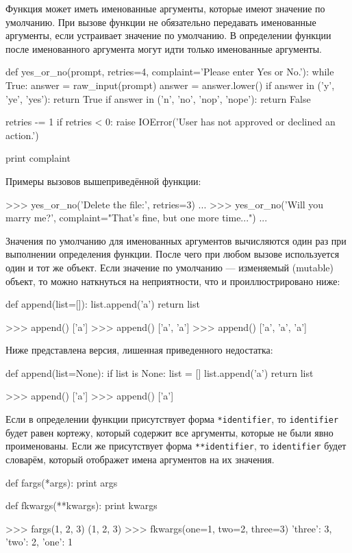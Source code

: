 Функция может иметь именованные аргументы, которые имеют значение по умолчанию. При вызове функции не обязательно передавать именованные аргументы, если устраивает значение по умолчанию. В определении функции после именованного аргумента могут идти только именованные аргументы.
\begin{pylst}{}{}
def yes_or_no(prompt, retries=4, complaint='Please enter Yes or No.'):
    while True:
        answer = raw_input(prompt)
        answer = answer.lower()
        if answer in ('y', 'ye', 'yes'):
            return True
        if answer in ('n', 'no', 'nop', 'nope'):
            return False

        retries -= 1
        if retries < 0:
            raise IOError('User has not approved or declined an action.')

        print complaint
\end{pylst}

Примеры вызовов вышеприведённой функции:
\begin{pylst}{}{}
>>> yes_or_no('Delete the file:', retries=3)
...
>>> yes_or_no('Will you marry me?',
              complaint="That's fine, but one more time...")
...
\end{pylst}

Значения по умолчанию для именованных аргументов вычисляются один раз при выполнении определения функции. После чего при любом вызове используется один и тот же объект. Если значение по умолчанию --- изменяемый (mutable) объект, то можно наткнуться на неприятности, что и проиллюстрировано ниже:
\begin{pylst}{}{}
def append(list=[]):
    list.append('a')
    return list

>>> append()
['a']
>>> append()
['a', 'a']
>>> append()
['a', 'a', 'a']
\end{pylst}

Ниже представлена версия, лишенная приведенного недостатка:
\begin{pylst}{}{}
def append(list=None):
    if list is None:
        list = []
    list.append('a')
    return list

>>> append()
['a']
>>> append()
['a']
\end{pylst}

Если в определении функции присутствует форма \lstinline{*identifier}, то \lstinline{identifier} будет равен кортежу, который содержит все аргументы, которые не были явно проименованы. Если же присутствует форма \lstinline{**identifier}, то \lstinline{identifier} будет словарём, который отображет имена аргументов на их значения.
\begin{pylst}{}{}
def fargs(*args):
    print args

def fkwargs(**kwargs):
    print kwargs

>>> fargs(1, 2, 3)
(1, 2, 3)
>>> fkwargs(one=1, two=2, three=3)
{'three': 3, 'two': 2, 'one': 1}
\end{pylst}

